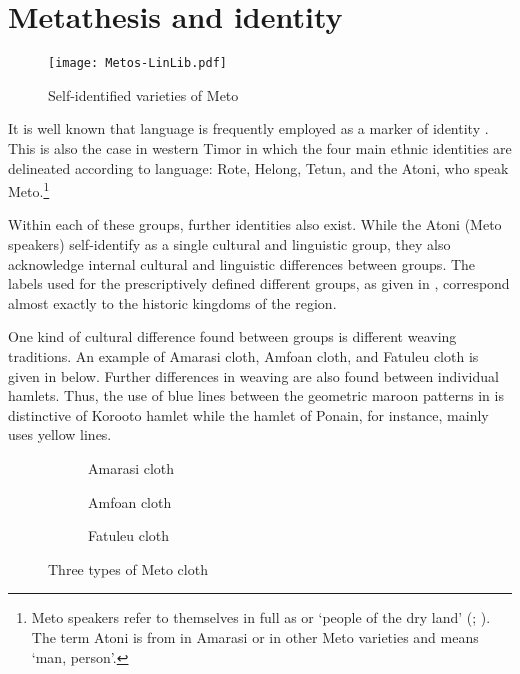 \section{Metathesis and identity}\label{sec:MetIde}

\begin{figure}[h]
	\caption{Self-identified varieties of Meto}\label{fig:SelIdeVarUabMeto-2}
	\texttt{[image: Metos-LinLib.pdf]}
\end{figure}

It is well known that language is frequently employed
as a marker of identity \citep{mi82,ed09,figa10}.
This is also the case in western Timor in which the four
main ethnic identities are delineated according to language:
Rote, Helong, Tetun, and the Atoni, who speak Meto.\footnote{
		Meto speakers refer to themselves in full as 
		or  `people of the dry land' (\citealt[i]{cu62}; \citealt[1]{scno71}).
		The term Atoni is from  in Amarasi
		or  in other Meto varieties and means `man, person'.}

Within each of these groups, further identities also exist.
While the Atoni (Meto speakers) self-identify as
a single cultural and linguistic group,
they also acknowledge internal cultural and linguistic differences between groups.
The labels used for the prescriptively defined different groups,
as given in ,
correspond almost exactly to the historic kingdoms of the region.

One kind of cultural difference found between groups is different weaving traditions.
An example of Amarasi cloth, Amfo{\Q}an cloth, and Fatule{\Q}u cloth
is given in  below.
Further differences in weaving are also found between individual hamlets.
Thus, the use of blue lines between the geometric maroon patterns
in  is distinctive of Koro{\Q}oto hamlet
while the hamlet of Ponain, for instance, mainly uses yellow lines.

\begin{figure}[h]
  \begin{subfigure}[b]{0.32\textwidth}
		\caption{Amarasi cloth}\label{fig:AmaClo}
  \end{subfigure}
  \begin{subfigure}[b]{0.32\textwidth}
		\caption{Amfo{\Q}an cloth}\label{fig:AmfClot}
  \end{subfigure}
  \begin{subfigure}[b]{0.32\textwidth}
		\caption{Fatule{\Q}u cloth}\label{fig:FatClot}
  \end{subfigure}
	\caption{Three types of Meto cloth}\label{fig:ThrTypMetClo}
\end{figure}

